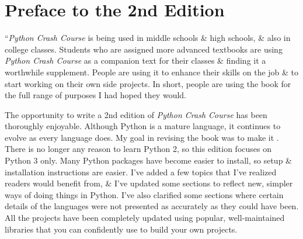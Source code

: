 \documentclass[oneside]{book}
\numberwithin{equation}{section}
\begin{document}
\section*{Preface to the 2nd Edition}
``\textit{Python Crash Course} is being used in middle schools \& high schools, \& also in college classes. Students who are assigned more advanced textbooks are using \textit{Python Crash Course} as a companion text for their classes \& finding it a worthwhile supplement. People are using it to enhance their skills on the job \& to start working on their own side projects. In short, people are using the book for the full range of purposes I had hoped they would.

The opportunity to write a 2nd edition of \textit{Python Crash Course} has been thoroughly enjoyable. Although Python is a mature language, it continues to evolve as every language does. My goal in revising the book was to make it . There is no longer any reason to learn Python 2, so this edition focuses on Python 3 only. Many Python packages have become easier to install, so setup \& installation instructions are easier. I've added a few topics that I've realized readers would benefit from, \& I've updated some sections to reflect new, simpler ways of doing things in Python. I've also clarified some sections where certain details of the languages were not presented as accurately as they could have been. All the projects have been completely updated using popular, well-maintained libraries that you can confidently use to build your own projects.
\end{document}
